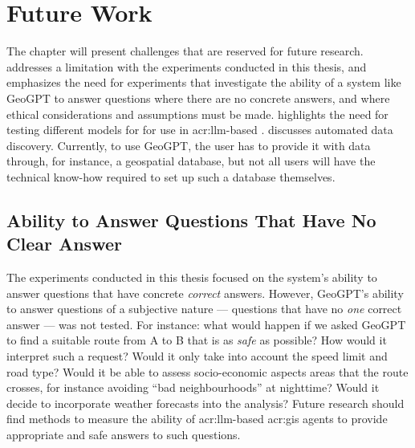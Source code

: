 \chapter{Future Work}
\label{cha:future-work}

\begin{comment}
Consider where you would like to extend or improve this work, or how somebody else could continue it.
These extensions might either be continuing the ongoing direction or taking a side direction that became obvious during the work.
Further, possible solutions to limitations in the work conducted, highlighted in Section~\ref{sec:discussion} may be presented.

Note that in the Specialisation Project Report, the Future Work section will be a key part of your plan for the novel work to be carried out in the next semester,
while in the Master's Thesis, the Future Work section rather will point to issues that others might be interested in addressing.
This can include options and alternatives that you did not try out yourself, or potential improvements and extensions to your experiments or system.
\end{comment}

The  chapter will present challenges that are reserved for future research.  addresses a limitation with the experiments conducted in this thesis, and emphasizes the need for experiments that investigate the ability of a system like GeoGPT to answer questions where there are no concrete answers, and where ethical considerations and assumptions must be made.  highlights the need for testing different models for for use in \acrshort{acr:llm}-based .  discusses automated data discovery. Currently, to use GeoGPT, the user has to provide it with data through, for instance, a geospatial database, but not all users will have the technical know-how required to set up such a database themselves.

\section{Ability to Answer Questions That Have No Clear Answer}
\label{sec:no-clear-answer}

The experiments conducted in this thesis focused on the system's ability to answer questions that have concrete \textit{correct} answers. However, GeoGPT's ability to answer questions of a subjective nature --- questions that have no \textit{one} correct answer --- was not tested. For instance: what would happen if we asked GeoGPT to find a suitable route from A to B that is as \textit{safe} as possible? How would it interpret such a request? Would it only take into account the speed limit and road type? Would it be able to assess socio-economic aspects areas that the route crosses, for instance avoiding \enquote{bad neighbourhoods} at nighttime? Would it decide to incorporate weather forecasts into the analysis? Future research should find methods to measure the ability of \acrshort{acr:llm}-based \acrshort{acr:gis} agents to provide appropriate and safe answers to such questions.

